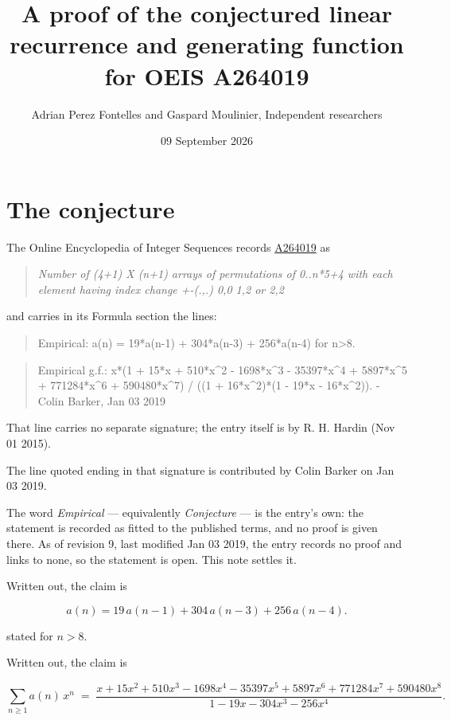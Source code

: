 \documentclass[11pt]{article}
\title{A proof of the conjectured linear recurrence and generating function for OEIS A264019}
\author{Adrian Perez Fontelles and Gaspard Moulinier, Independent researchers}
\date{09 September 2026}
\theoremstyle{definition}
\begin{document}
\maketitle
\section{The conjecture}

The Online Encyclopedia of Integer Sequences records \href{https://oeis.org/A264019}{A264019} as

\begin{quote}\itshape Number of (4+1) X (n+1) arrays of permutations of 0..n*5+4 with each element having index change +-(.,.) 0,0 1,2 or 2,2\end{quote}

and carries in its Formula section the lines:

\begin{quote}\ttfamily Empirical: a(n) = 19*a(n-1) + 304*a(n-3) + 256*a(n-4) for n>8.\end{quote}

\begin{quote}\ttfamily Empirical g.f.: x*(1 + 15*x + 510*x\textasciicircum{}2 - 1698*x\textasciicircum{}3 - 35397*x\textasciicircum{}4 + 5897*x\textasciicircum{}5 + 771284*x\textasciicircum{}6 + 590480*x\textasciicircum{}7) / ((1 + 16*x\textasciicircum{}2)*(1 - 19*x - 16*x\textasciicircum{}2)). - Colin Barker, Jan 03 2019\end{quote}

That line carries no separate signature; the entry itself is by R. H. Hardin (Nov 01 2015).

The line quoted ending in that signature is contributed by Colin Barker on Jan 03 2019.

The word {\itshape Empirical} --- equivalently {\itshape Conjecture} --- is the entry's own: the statement is recorded as fitted to the published terms, and no proof is given there. As of revision 9, last modified Jan 03 2019, the entry records no proof and links to none, so the statement is open. This note settles it.

Written out, the claim is

\[a(n) = 19\,a(n-1) + 304\,a(n-3) + 256\,a(n-4).\]

stated for $n > 8$.

Written out, the claim is

\[\sum_{n \ge 1} a(n)\,x^n \;=\; \frac{x + 15x^{2} + 510x^{3} - 1698x^{4} - 35397x^{5} + 5897x^{6} + 771284x^{7} + 590480x^{8}}{1 - 19x - 304x^{3} - 256x^{4}}.\]
\end{document}
